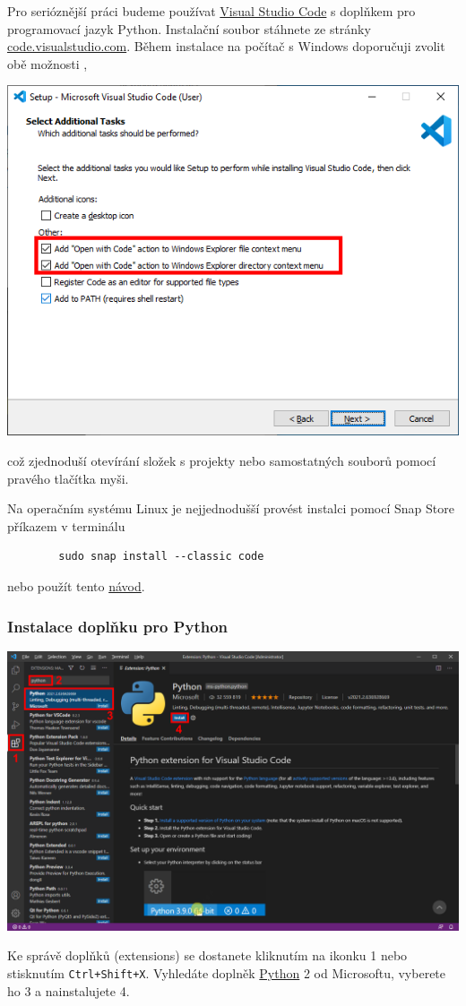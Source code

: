 \documentclass[a4paper,11pt,twoside]{article}
\def\code#1{\textnormal{\texttt{#1}}}
\theoremstyle{red}
\theoremstyle{green}
\begin{document}
    Pro serióznější práci budeme používat \href{https://code.visualstudio.com}{Visual Studio Code} s doplňkem pro programovací jazyk Python.
    Instalační soubor stáhnete ze stránky \href{https://code.visualstudio.com}{code.visualstudio.com}.
    Během instalace na počítač s Windows doporučuji zvolit obě možnosti ,
    \begin{center}\includegraphics[width=0.5\linewidth]{VSCodeInstall.png}\end{center}
    což zjednoduší otevírání složek s projekty nebo samostatných souborů pomocí pravého tlačítka myši.

    Na operačním systému Linux je nejjednodušší provést instalci pomocí Snap Store příkazem v terminálu
    \begin{lstlisting}
        sudo snap install --classic code\end{lstlisting}
    nebo použít tento \href{https://code.visualstudio.com/docs/setup/linux}{návod}.

\subsubsection{Instalace doplňku pro Python}
    \begin{center}\includegraphics[width=\linewidth]{VSCodeInstallPython.png}\end{center}
    Ke správě doplňků (extensions) se dostanete kliknutím na ikonku {\color{red} 1} nebo stisknutím \code{Ctrl+Shift+X}. 
    Vyhledáte doplněk \href{https://marketplace.visualstudio.com/items?itemName=ms-python.python}{Python} {\color{red} 2} od Microsoftu, vyberete ho {\color{red} 3} a nainstalujete {\color{red} 4}.
\end{document}
